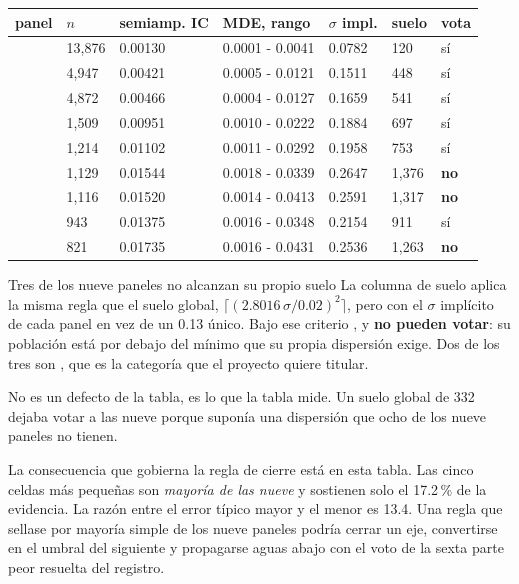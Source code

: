 \begin{center}
\small
\begin{tabularx}{\linewidth}{@{}l R{1.7cm} R{1.9cm} R{2.5cm} R{1.5cm} R{1.5cm} X@{}}
\toprule
panel & $n$ & semiamp. IC & MDE, rango & $\sigma$ impl. & suelo & vota\\
\midrule
{} & 13{,}876 & 0.00130 & 0.0001 - 0.0041 & 0.0782 &   120 & sí\\
 &  4{,}947 & 0.00421 & 0.0005 - 0.0121 & 0.1511 &   448 & sí\\
 &  4{,}872 & 0.00466 & 0.0004 - 0.0127 & 0.1659 &   541 & sí\\
 &  1{,}509 & 0.00951 & 0.0010 - 0.0222 & 0.1884 &   697 & sí\\
 &  1{,}214 & 0.01102 & 0.0011 - 0.0292 & 0.1958 &   753 & sí\\
 &  1{,}129 & 0.01544 & 0.0018 - 0.0339 & 0.2647 & 1{,}376 & \textbf{no}\\
 &  1{,}116 & 0.01520 & 0.0014 - 0.0413 & 0.2591 & 1{,}317 & \textbf{no}\\
 &     943  & 0.01375 & 0.0016 - 0.0348 & 0.2154 &   911 & sí\\
 &     821  & 0.01735 & 0.0016 - 0.0431 & 0.2536 & 1{,}263 & \textbf{no}\\
\bottomrule
\end{tabularx}
\end{center}

\begin{aviso}{Tres de los nueve paneles no alcanzan su propio suelo}
La columna de suelo aplica la misma regla que el suelo global,
$\lceil (2.8016\,\sigma/0.02)^2 \rceil$, pero con el $\sigma$ implícito de cada
panel en vez de un 0.13 único. Bajo ese criterio ,  y
 \textbf{no pueden votar}: su población está por debajo del mínimo que
su propia dispersión exige. Dos de los tres son , que es la categoría que
el proyecto quiere titular.

No es un defecto de la tabla, es lo que la tabla mide. Un suelo global de 332
dejaba votar a las nueve porque suponía una dispersión que ocho de los nueve
paneles no tienen.
\end{aviso}

La consecuencia que gobierna la regla de cierre está en esta tabla. Las cinco
celdas más pequeñas son \emph{mayoría de las nueve} y sostienen solo el 17.2\,\%
de la evidencia. La razón entre el error típico mayor y el menor es 13.4. Una regla
que sellase por mayoría simple de los nueve paneles podría cerrar un eje, convertirse
en el umbral del siguiente y propagarse aguas abajo con el voto de la sexta parte
peor resuelta del registro.
